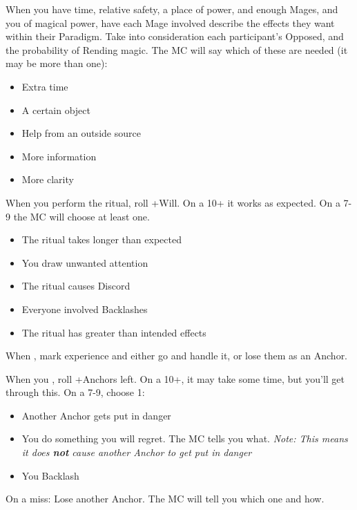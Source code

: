 \begin{multicols}{3}
  \begin{move}
    When you have time, relative safety, a place of power, and enough
    Mages, and you  of magical power, have
    each Mage involved describe the effects they want within their Paradigm.
    Take into consideration each participant's Opposed, and the
    probability of Rending magic. The MC will say which of these are
    needed (it may be more than one):
    \begin{itemize}
      \setlength\itemsep{0em}
    \item Extra time
    \item A certain object
    \item Help from an outside source
    \item More information
    \item More clarity
    \end{itemize}
    When you perform the ritual, roll +Will. On a 10+ it works as
    expected. On a 7-9 the MC will choose at least one.
    \begin{itemize}
      \setlength\itemsep{0em}
    \item The ritual takes longer than expected
    \item You draw unwanted attention
    \item The ritual causes Discord
    \item Everyone involved Backlashes
    \item The ritual has greater than intended effects
    \end{itemize}
  \end{move}

  \SEPARATOR

  \begin{move}
    When , mark
    experience and either go and handle it, or lose them as an
    Anchor.
  \end{move}

  \SEPARATOR

  \begin{move}
    When you , roll +Anchors left. On a 10+,
    it may take some time, but you'll get through this. On a 7-9,
    choose 1:
    \begin{itemize}
      \setlength\itemsep{0em}
    \item Another Anchor gets put in danger
    \item You do something you will regret. The MC tells you
      what. \textit{Note: This means it does \textbf{not} cause
        another Anchor to get put in danger}
      \item You Backlash
    \end{itemize}
    On a miss: Lose another Anchor. The MC will tell you which one and
    how.
  \end{move}


\end{multicols}
